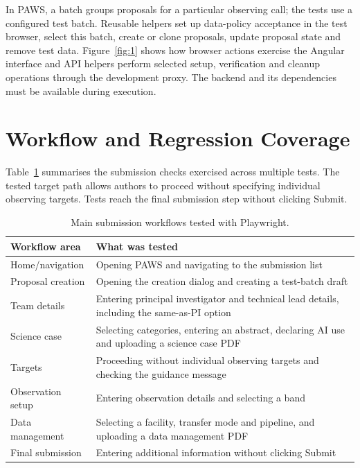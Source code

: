 \documentclass[11pt,twoside]{article}
\begin{document}
In PAWS, a batch groups proposals for a particular observing call; the tests use a configured test batch. Reusable helpers set up data-policy acceptance in the test browser, select this batch, create or clone proposals, update proposal state and remove test data. Figure~\ref{fig:1} shows how browser actions exercise the Angular interface and API helpers perform selected setup, verification and cleanup operations through the development proxy. The backend and its dependencies must be available during execution.


\section{Workflow and Regression Coverage}

Table~\ref{tab:coverage} summarises the submission checks exercised across multiple tests. The tested target path allows authors to proceed without specifying individual observing targets. Tests reach the final submission step without clicking Submit.

\begin{table}[t]
\caption{Main submission workflows tested with Playwright.}
\label{tab:coverage}
\centering
\small
\begin{tabular}{@{}p{}p{}@{}}
\hline
\textbf{Workflow area} & \textbf{What was tested} \\
\hline
Home/navigation & Opening PAWS and navigating to the submission list \\
Proposal creation & Opening the creation dialog and creating a test-batch draft \\
Team details & Entering principal investigator and technical lead details, including the same-as-PI option \\
Science case & Selecting categories, entering an abstract, declaring AI use and uploading a science case PDF \\
Targets & Proceeding without individual observing targets and checking the guidance message \\
Observation setup & Entering observation details and selecting a band \\
Data management & Selecting a facility, transfer mode and pipeline, and uploading a data management PDF \\
Final submission & Entering additional information without clicking Submit \\
\hline
\end{tabular}
\end{table}
\end{document}

